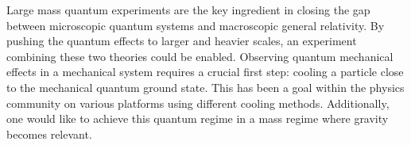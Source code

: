 \label{sec:introduction}

Large mass quantum experiments are the key ingredient in closing the gap between microscopic quantum systems and macroscopic general relativity. By pushing the quantum effects to larger and heavier scales, an experiment combining these two theories could be enabled. Observing quantum mechanical effects in a mechanical system requires a crucial first step: cooling a particle close to the mechanical quantum ground state. This has been a goal within the physics community on various platforms using different cooling methods. Additionally, one would like to achieve this quantum regime in a mass regime where gravity becomes relevant.

